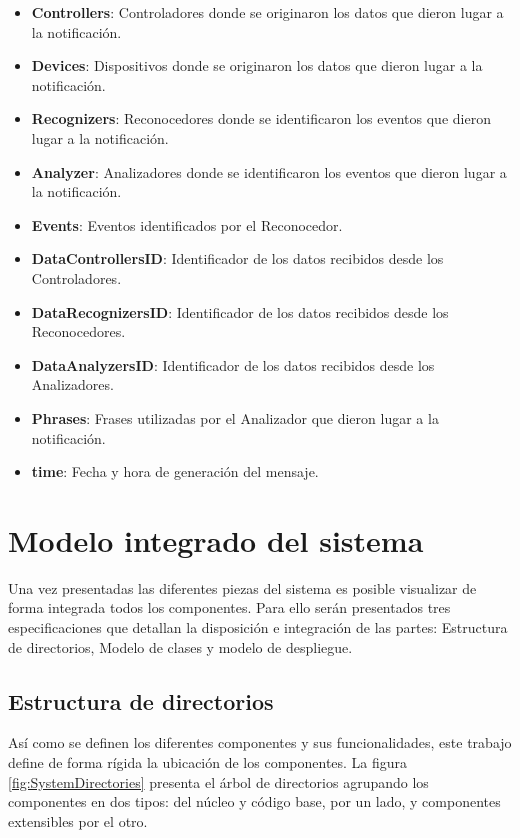             \begin{itemize}
                \item \textbf{Controllers}: Controladores donde se originaron los datos que dieron lugar a la notificación.
                \item \textbf{Devices}: Dispositivos donde se originaron los datos que dieron lugar a la notificación.
                \item \textbf{Recognizers}: Reconocedores donde se identificaron los eventos que dieron lugar a la notificación.
                \item \textbf{Analyzer}: Analizadores donde se identificaron los eventos que dieron lugar a la notificación.
                \item \textbf{Events}: Eventos identificados por el Reconocedor.
                \item \textbf{DataControllersID}: Identificador de los datos recibidos desde los Controladores.
                \item \textbf{DataRecognizersID}: Identificador de los datos recibidos desde los Reconocedores.
                \item \textbf{DataAnalyzersID}: Identificador de los datos recibidos desde los Analizadores.
                \item \textbf{Phrases}: Frases utilizadas por el Analizador que dieron lugar a la notificación.
                \item \textbf{time}: Fecha y hora de generación del mensaje.
            \end{itemize}
        
    \newpage

\section{Modelo integrado del sistema}
\label{sec:IntegratedModel}
    Una vez presentadas las diferentes piezas del sistema es posible visualizar de forma integrada todos los componentes. Para ello serán presentados tres especificaciones que detallan la disposición e integración de las partes: Estructura de directorios, Modelo de clases y modelo de despliegue.
        
    \subsection{Estructura de directorios}
    \label{sub:Directories}
        Así como se definen los diferentes componentes y sus funcionalidades, este trabajo define de forma rígida la ubicación de los componentes. La figura \ref{fig:SystemDirectories} presenta el árbol de directorios agrupando los componentes en dos tipos: del núcleo y código base, por un lado, y componentes extensibles por el otro.
        
